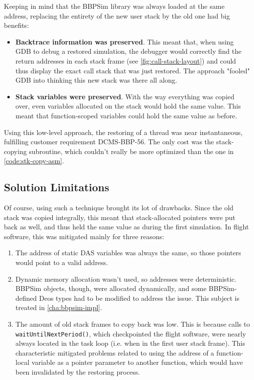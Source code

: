 Keeping in mind that the \gls{BBPSim} library was always loaded at the same address, replacing the entirety of the new user stack by the old one had big benefits:
\begin{itemize}
	\item \textbf{Backtrace information was preserved}. This meant that, when using GDB to debug a restored simulation, the debugger would correctly find the return addresses in each stack frame (see \autoref{fig:call-stack-layout}) and could thus display the exact call stack that was just restored. The approach "fooled" GDB into thinking this new stack was there all along.
	\item \textbf{Stack variables were preserved}. With the way everything was copied over, even variables allocated on the stack would hold the same value. This meant that function-scoped variables could hold the same value as before.
\end{itemize}

Using this low-level approach, the restoring of a thread was near instantaneous, fulfilling customer requirement DCMS-BBP-56. The only cost was the stack-copying subroutine, which couldn't really be more optimized than the one in \autoref{code:stk-copy-asm}.

\subsection*{Solution Limitations}
Of course, using such a technique brought its lot of drawbacks. Since the old stack was copied integrally, this meant that stack-allocated pointers were put back as well, and thus held the same value as during the first simulation. In flight software, this was mitigated mainly for three reasons: 
\begin{enumerate}
	\item The address of static DAS variables was always the same, so those pointers would point to a valid address.
	\item Dynamic memory allocation wasn't used, so addresses were deterministic. BBPSim objects, though, were allocated dynamically, and some BBPSim-defined Deos types had to be modified to address the issue. This subject is treated in \autoref{cha:bbpsim-impl}. 
	\item The amount of old stack frames to copy back was low. This is because calls to \texttt{waitUntilNextPeriod()}, which checkpointed the flight software, were nearly always located in the task loop (i.e. when in the first user stack frame). This characteristic mitigated problems related to using the address of a function-local variable as a pointer parameter to another function, which would have been invalidated by the restoring process. 
\end{enumerate}

